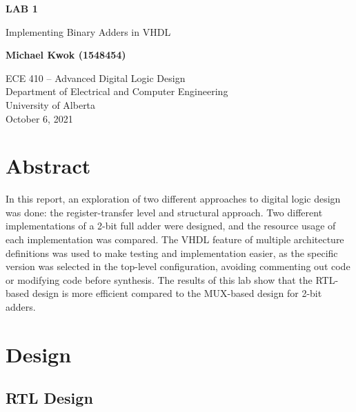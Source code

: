 \documentclass[12pt]{article}
\begin{document}
\begin{titlepage}
    \begin{center}
        \vspace*{1cm}

        \textbf{LAB 1}

        \vspace{0.5cm}

        Implementing Binary Adders in VHDL

        \vspace{1.5cm}

        \textbf{Michael Kwok (1548454)}

        \vfill

        ECE 410 -- Advanced Digital Logic Design\\
        Department of Electrical and Computer Engineering\\
        University of Alberta\\
        October 6, 2021

    \end{center}
\end{titlepage}

\tableofcontents
\listoffigures
\listoftables
\pagebreak

\section{Abstract}

In this report, an exploration of two different approaches to digital logic design was done: the register-transfer level and structural approach.
Two different implementations of a 2-bit full adder were designed, and the resource usage of each implementation was compared.
The VHDL feature of multiple architecture definitions was used to make testing and implementation easier,
as the specific version was selected in the top-level configuration,
avoiding commenting out code or modifying code before synthesis.
The results of this lab show that the RTL-based design is more efficient compared to the MUX-based design for 2-bit adders.

\section{Design}

\subsection{RTL Design}
\end{document}

